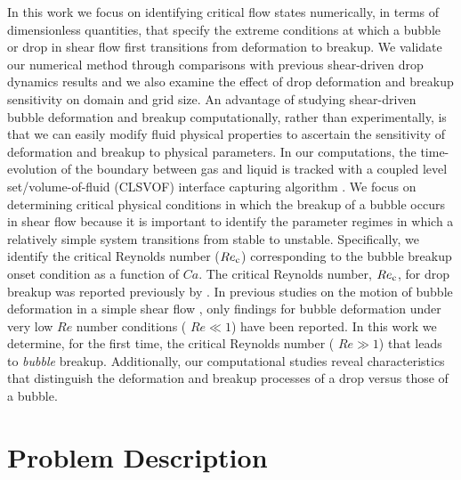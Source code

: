 \documentclass[%
 reprint,
 showkeys,
 amsmath,amssymb,
 aps,
 prfluids,
 onecolumn
]{revtex4-2}
\begin{document}
In this work we focus on identifying critical flow states numerically, in terms
of dimensionless quantities, that specify the extreme conditions at which a
bubble or drop in shear flow first transitions from deformation to breakup.
We validate our numerical method through comparisons with previous
shear-driven drop dynamics results and we also examine the effect of drop
deformation and breakup sensitivity on domain and grid size.  An advantage of
studying shear-driven bubble deformation and breakup computationally, rather
than experimentally, is that we can easily modify fluid physical properties to
ascertain the sensitivity of deformation and breakup to physical parameters.
In our computations, the time-evolution of the boundary between gas and liquid
is tracked with a coupled level set/volume-of-fluid (CLSVOF) interface
capturing algorithm \cite{SusPuc00,SUSSMAN2007469}.  
We focus on determining critical physical
conditions in which the breakup of a bubble occurs in shear flow because it is
important to identify the parameter regimes in which a relatively simple system
transitions from stable to unstable.  Specifically, we identify the critical
Reynolds number ($Re_{\rm c}$) corresponding to the bubble breakup onset condition as
a function of $Ca$. 
The critical Reynolds number, $Re_{\rm c}$, for drop breakup was 
reported previously by \cite{LiRenRen00}.
{\color{red} In previous studies on the motion of bubble deformation
in a simple shear flow \cite{RusMan02, MulTobDreFisWin08}, only findings for bubble deformation under very low 
$Re$ number conditions ({\color{blue} $Re \ll 1$}) have been reported.}
In this work we determine, for the first time, the critical Reynolds number ({\color{blue} $Re \gg 1$}) 
that leads to \emph{bubble} breakup.  Additionally, our computational studies reveal characteristics that
distinguish the deformation and breakup processes of a drop versus those of a bubble.

\section{Problem Description}
\end{document}
